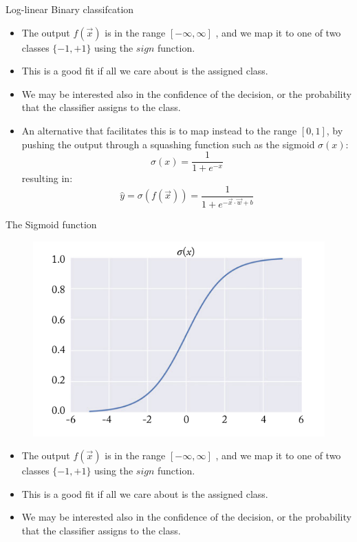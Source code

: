 \documentclass[handout]{beamer}
\begin{document}
\begin{frame}{Log-linear Binary classifcation}
\begin{scriptsize}
\begin{itemize}
\item The output $f(\vec{x})$ is in the range $[-\infty,\infty]$ , and we map it to one of two classes $\{-1,+1\}$ using the $sign$ function.
\item This is a good fit if all we care about is the assigned class.
\item We may be interested also in the confidence of the decision, or the probability that the classifier assigns to the class.
\item An alternative that facilitates this is to map instead to the range $[0,1]$, by pushing the output through a squashing function such as the sigmoid $\sigma(x)$:
\begin{equation}
\sigma(x) = \frac{1}{1+e^{-x}}  
\end{equation}
resulting in: 
\begin{equation}
\hat{y}=\sigma(f(\vec{x})) = \frac{1}{1+e^{-\vec{x}\cdot \vec{w}+b}}  
\end{equation}

\end{itemize}
\end{scriptsize}
\end{frame}

\begin{frame}{The Sigmoid function}
\begin{figure}[htb]
	\centering
	 \includegraphics[scale=0.3]{pics/sigmoid.png}
\end{figure}
\begin{scriptsize}
\begin{itemize}
\item The output $f(\vec{x})$ is in the range $[-\infty,\infty]$ , and we map it to one of two classes $\{-1,+1\}$ using the $sign$ function.
\item This is a good fit if all we care about is the assigned class.
\item We may be interested also in the confidence of the decision, or the probability that the classifier assigns to the class.
\end{itemize}
\end{scriptsize}
\end{frame}
\end{document}
